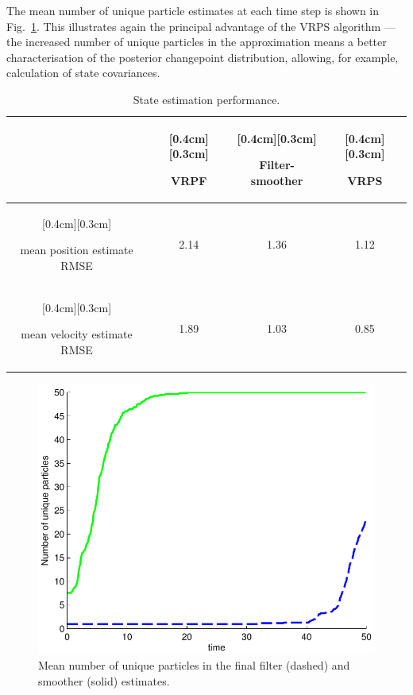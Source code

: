 \documentclass[10pt,twocolumn,twoside]{IEEEtran}
\begin{document}
The mean number of unique particle estimates at each time step is shown in Fig.~\ref{fig:tracking_unique_particles}. This illustrates again the principal advantage of the VRPS algorithm --- the increased number of unique particles in the approximation means a better characterisation of the posterior changepoint distribution, allowing, for example, calculation of state covariances.

\begin{table}%
\caption{State estimation performance.}
\label{tab:tracking_state_performance}
\centering
\renewcommand{\arraystretch}{1.5}
\begin{tabular}{|c|c|c|c|}
\hline
 &\raisebox{0cm}[0.4cm][0.3cm]{\parbox[c]{1.5cm}{\centering VRPF}} & \raisebox{0cm}[0.4cm][0.3cm]{\parbox[c]{1.5cm}{\centering Filter-smoother}} & \raisebox{0cm}[0.4cm][0.3cm]{\parbox[c]{1.5cm}{\centering VRPS}} \\
\hline \hline
\raisebox{0cm}[0.4cm][0.3cm]{\parbox[c]{2cm}{\centering mean position estimate RMSE}} & 2.14 & 1.36 & 1.12 \\
\hline
\raisebox{0cm}[0.4cm][0.3cm]{\parbox[c]{2cm}{\centering mean velocity estimate RMSE}} & 1.89 & 1.03 & 0.85 \\
\hline
\end{tabular}
\end{table}

\begin{figure}[!t]
\centering
\includegraphics[width=0.75\columnwidth]{tracking_unique_particles.pdf}
\caption{Mean number of unique particles in the final filter (dashed) and smoother (solid) estimates.}
\label{fig:tracking_unique_particles}
\end{figure}
\end{document}
